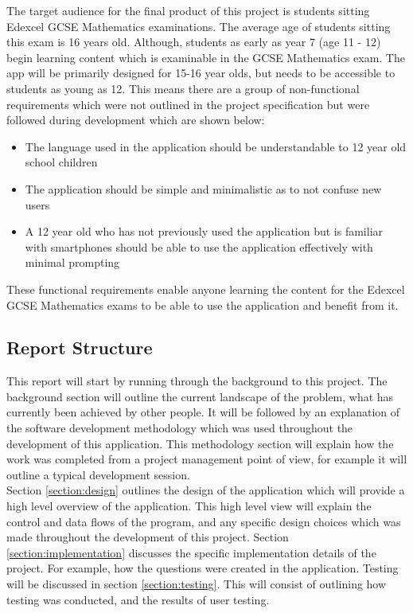 \documentclass{article}
\begin{document}
The target audience for the final product of this project is students sitting Edexcel GCSE Mathematics examinations. The average age of students sitting this exam is 16 years old. Although, students as early as year 7 (age 11 - 12) begin learning content which is examinable in the GCSE Mathematics exam. The app will be primarily designed for 15-16 year olds, but needs to be accessible to students as young as 12. This means there are a group of non-functional requirements which were not outlined in the project specification but were followed during development which are shown below: 

\begin{itemize}
	\item The language used in the application should be understandable to 12 year old school children
	\item The application should be simple and minimalistic as to not confuse new users
	\item A 12 year old who has not previously used the application but is familiar with smartphones should be able to use the application effectively with minimal prompting
\end{itemize}

These functional requirements enable anyone learning the content for the Edexcel GCSE Mathematics exams to be able to use the application and benefit from it.


\subsection{Report Structure}

This report will start by running through the background to this project. The background section will outline the current landscape of the problem, what has currently been achieved by other people. It will be followed by an explanation of the software development methodology which was used throughout the development of this application. This methodology section will explain how the work was completed from a project management point of view, for example it will outline a typical development session. \\

Section \ref{section:design} outlines the design of the application which will provide a high level overview of the application. This high level view will explain the control and data flows of the program, and any specific design choices which was made throughout the development of this project. Section \ref{section:implementation} discusses the specific implementation details of the project. For example, how the questions were created in the application. Testing will be discussed in section \ref{section:testing}. This will consist of outlining how testing was conducted, and the results of user testing. \\
\end{document}
